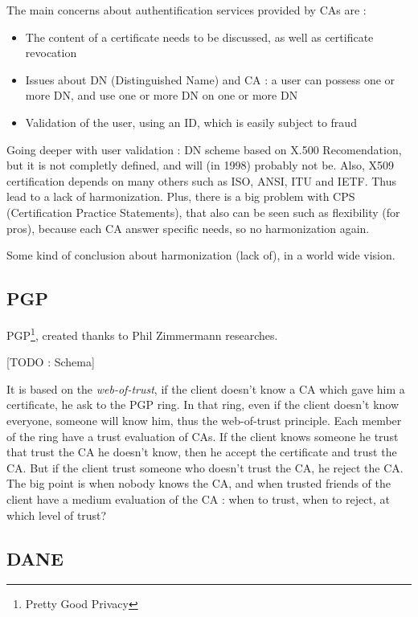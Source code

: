 \documentclass[journal, a4paper]{IEEEtran}
\begin{document}
The main concerns about authentification services provided by CAs are :

\begin{itemize}
	\item The content of a certificate needs to be discussed, as well as certificate revocation
	\item Issues about DN (Distinguished Name) and CA : a user can possess one or more DN, and use one or more DN on one or more DN
	\item Validation of the user, using an ID, which is easily subject to fraud
\end{itemize}

Going deeper with user validation : DN scheme based on X.500 Recomendation, but it is not completly defined, and will (in 1998) probably not be. Also, X509 certification depends on many others such as ISO, ANSI, ITU and IETF. Thus lead to a lack of harmonization.
Plus, there is a big problem with CPS (Certification Practice Statements), that also can be seen such as flexibility (for pros), because each CA answer specific needs, so no harmonization again.

Some kind of conclusion about harmonization (lack of), in a world wide vision.

\subsection{PGP}

PGP\footnote{Pretty Good Privacy}, created thanks to Phil Zimmermann researches.

[TODO : Schema]

It is based on the \textit{web-of-trust}, if the client doesn't know a CA which gave him a certificate, he ask to the PGP ring.
In that ring, even if the client doesn't know everyone, someone will know him, thus the web-of-trust principle.
Each member of the ring have a trust evaluation of CAs. If the client knows someone he trust that trust the CA he doesn't know, then he accept the certificate and trust the CA.
But if the client trust someone who doesn't trust the CA, he reject the CA.
The big point is when nobody knows the CA, and when trusted friends of the client have a medium evaluation of the CA : when to trust, when to reject, at which level of trust?

\subsection{DANE}
\end{document}
